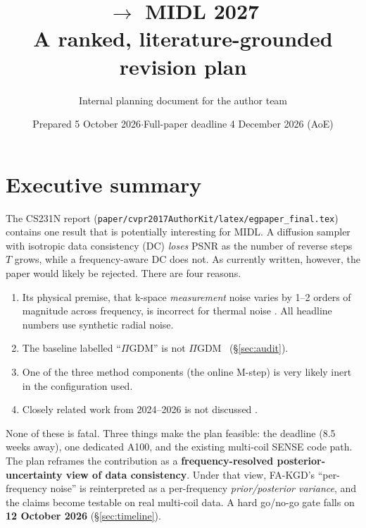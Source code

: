 \documentclass[10pt,a4paper]{article}
\title{\fakgd{} $\rightarrow$ MIDL 2027\\[2pt]
\large A ranked, literature-grounded revision plan}
\author{Internal planning document for the \fakgd{} author team}
\date{Prepared 5 October 2026\quad$\cdot$\quad Full-paper deadline 4 December 2026 (AoE)}
\newcommand{\fakgd}{FA-KGD}
\newcommand{\pigdm}{$\Pi$GDM}
\newcommand{\code}[1]{\texttt{\small #1}}
\begin{document}
\maketitle

\section*{Executive summary}
The CS231N report (\code{paper/cvpr2017AuthorKit/latex/egpaper\_final.tex}) contains one
result that is potentially interesting for MIDL. A diffusion sampler with isotropic
data consistency (DC) \emph{loses} PSNR as the number of reverse steps $T$ grows,
while a frequency-aware DC does not. As currently written, however, the paper would
likely be rejected. There are four reasons.
\begin{enumerate}
  \item Its physical premise, that k-space \emph{measurement} noise varies by 1--2 orders
        of magnitude across frequency, is incorrect for thermal noise
        \cite{roemer1990phased,kellman2005snr}. All headline numbers use synthetic
        radial noise.
  \item The baseline labelled ``\pigdm'' is not \pigdm~\cite{song2023pigdm}
        (\S\ref{sec:audit}).
  \item One of the three method components (the online M-step) is very likely inert
        in the configuration used.
  \item Closely related work from 2024--2026 is not discussed
        \cite{peng2024optimal,tian2026frequency,ozturkler2023smrd,lee2026msc}.
\end{enumerate}

None of these is fatal. Three things make the plan feasible: the deadline (8.5 weeks
away), one dedicated A100, and the existing multi-coil SENSE code path. The plan
reframes the contribution as a \textbf{frequency-resolved posterior-uncertainty view of
data consistency}. Under that view, \fakgd's ``per-frequency noise'' is reinterpreted as
a per-frequency \emph{prior/posterior variance}, and the claims become testable on real
multi-coil data. A hard go/no-go gate falls on \textbf{12 October 2026}
(\S\ref{sec:timeline}).
\end{document}
